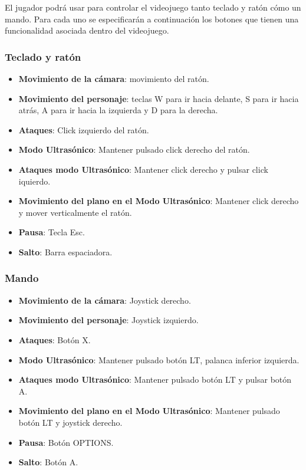 El jugador podrá usar para controlar el videojuego tanto teclado y ratón cómo un mando. Para cada uno se especificarán a continuación los botones que tienen una funcionalidad asociada dentro del videojuego.

\subsubsection{Teclado y ratón}


\begin{itemize}    
    \item \textbf{Movimiento de la cámara}:  movimiento del ratón.
    \item \textbf{Movimiento del personaje}:  teclas W para ir hacia delante, S para ir hacia atrás, A para ir hacia la izquierda y D para la derecha.
    \item \textbf{Ataques}: Click izquierdo del ratón.
    \item \textbf{Modo Ultrasónico}: Mantener pulsado click derecho del ratón.
    \item \textbf{Ataques modo Ultrasónico}: Mantener click derecho y pulsar click iquierdo.
    \item \textbf{Movimiento del plano en el Modo Ultrasónico}: Mantener click derecho y mover verticalmente el ratón.
    \item \textbf{Pausa}: Tecla Esc.
    \item \textbf{Salto}: Barra espaciadora.
\end{itemize}

\subsubsection{Mando}

\begin{itemize}    
    \item \textbf{Movimiento de la cámara}:  Joystick derecho.
    \item \textbf{Movimiento del personaje}:  Joystick izquierdo.
    \item \textbf{Ataques}: Botón X.
    \item \textbf{Modo Ultrasónico}: Mantener pulsado botón LT, palanca inferior izquierda.
    \item \textbf{Ataques modo Ultrasónico}: Mantener pulsado botón LT y pulsar botón A.
    \item \textbf{Movimiento del plano en el Modo Ultrasónico}: Mantener pulsado botón LT y joystick derecho.
    \item \textbf{Pausa}: Botón OPTIONS.
    \item \textbf{Salto}: Botón A.
\end{itemize}

